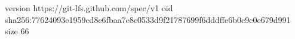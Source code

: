 version https://git-lfs.github.com/spec/v1
oid sha256:77624093e1959cd8e6fbaa7e8e0533d9f21787699f6dddffe6b0c9c0e679d991
size 66

